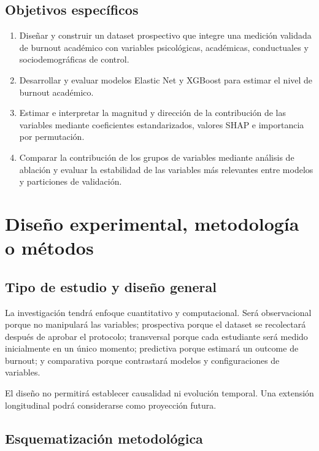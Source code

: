 \documentclass[11pt,a4paper]{article}
\begin{document}
\subsection{Objetivos específicos}

\begin{enumerate}
  \item Diseñar y construir un dataset prospectivo que integre una medición validada de burnout académico con variables psicológicas, académicas, conductuales y sociodemográficas de control.
  \item Desarrollar y evaluar modelos Elastic Net y XGBoost para estimar el nivel de burnout académico.
  \item Estimar e interpretar la magnitud y dirección de la contribución de las variables mediante coeficientes estandarizados, valores SHAP e importancia por permutación.
  \item Comparar la contribución de los grupos de variables mediante análisis de ablación y evaluar la estabilidad de las variables más relevantes entre modelos y particiones de validación.
\end{enumerate}

\section{Diseño experimental, metodología o métodos}

\subsection{Tipo de estudio y diseño general}

La investigación tendrá enfoque cuantitativo y computacional. Será observacional porque no manipulará las variables; prospectiva porque el dataset se recolectará después de aprobar el protocolo; transversal porque cada estudiante será medido inicialmente en un único momento; predictiva porque estimará un outcome de burnout; y comparativa porque contrastará modelos y configuraciones de variables.

El diseño no permitirá establecer causalidad ni evolución temporal. Una extensión longitudinal podrá considerarse como proyección futura.

\subsection{Esquematización metodológica}
\end{document}
